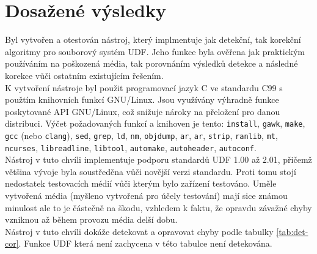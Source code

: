 \section{Dosažené výsledky}
\label{sec:vysledky}
Byl vytvořen a otestován nástroj, který implmentuje jak detekční, tak korekční algoritmy pro souborový systém UDF. Jeho funkce byla ověřena jak praktickým používáním na poškozená média, tak porovnáním výsledků detekce a následné korekce vůči ostatním existujícím řešením.\\
K vytvoření nástroje byl použit programovací jazyk C ve standardu C99 s použtím knihovních funkcí GNU/Linux. Jsou využívány výhradně funkce poskytované API GNU/Linux, což snižuje nároky na přeložení pro danou distribuci. Výčet požadovaných funkcí a knihoven je tento: \texttt{install}, \texttt{gawk}, \texttt{make}, \texttt{gcc} (nebo \texttt{clang}), \texttt{sed}, \texttt{grep}, \texttt{ld}, \texttt{nm}, \texttt{objdump}, \texttt{ar}, \texttt{ar}, \texttt{strip}, \texttt{ranlib}, \texttt{mt}, \texttt{ncurses}, \texttt{libreadline}, \texttt{libtool}, \texttt{automake}, \texttt{autoheader}, \texttt{autoconf}.\\
Nástroj v tuto chvíli implementuje podporu standardů UDF 1.00 až 2.01, přičemž většina vývoje byla soustředěna vůči novější verzi standardu. Proti tomu stojí nedostatek testovacích médií vůči kterým bylo zařízení testováno. Uměle vytvořená média (myšleno vytvořená pro účely testování) mají sice známou minulost ale to je částečně na škodu, vzhledem k faktu, že opravdu závažné chyby vzniknou až během provozu média delší dobu.\\
Nástroj v tuto chvíli dokáže detekovat a opravovat chyby podle tabulky \ref{tab:det-cor}. Funkce UDF která není zachycena v této tabulce není detekována.
